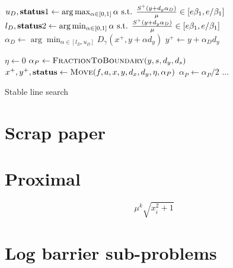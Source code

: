 \documentclass{article}
\begin{document}
\begin{algorithm}[H]
\begin{algorithmic}
\State $u_{D}, \textbf{status}1 \gets \arg \max_{\alpha \in [0,1]} {\alpha} \text{ s.t. } \frac{S^{+} (y + d_{y} \alpha_{D})}{\mu} \in [ e \beta_{1}, e / \beta_{1} ] $
\State $l_{D}, \textbf{status}2 \gets \arg \min_{\alpha \in [0,1]} {\alpha} \text{ s.t. } \frac{S^{+} (y + d_{y} \alpha_{D})}{\mu} \in [ e \beta_{1}, e / \beta_{1} ] $
\State $\alpha_{D} \gets \arg \min_{ \alpha \in [l_{D}, u_{D}] }{ D_{\gamma}(x^{+}, y  + \alpha d_{y} ) }$
\State $y^{+} \gets y + \alpha_{D} d_{y}$
\EndFunction
\end{algorithmic}
\end{algorithm}





\begin{algorithm}[H]
\begin{algorithmic}
\State $\eta \gets 0$
\State $\alpha_{P} \gets \Call{FractionToBoundary}{y, s, d_{y}, d_{s} }$
\State  $x^{+}, y^{+}, \status \gets \Call{Move}{\obj, \cons, x, y, d_{x}, d_{y}, \eta, \alpha_{P}}$
\If{$\status = \feasible$}
\State {}
\Else
\State 
\EndIf
\Else
\State $\alpha_{P} \gets \alpha_{P} /2$
\EndIf
\State ...
\EndFor
\EndFunction
\end{algorithmic}
\caption{Stable line search}
\end{algorithm}



\section{Scrap paper}

\section{Proximal}

$$
\mu^k \sqrt{ x_i^2 + 1 }
$$

\section{Log barrier sub-problems}
\end{document}
